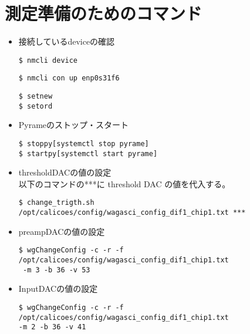 

\section{測定準備のためのコマンド}
\begin{itemize}

\item 接続しているdeviceの確認
\begin{screen}
\begin{verbatim}
$ nmcli device
\end{verbatim}
\end{screen}

\begin{screen}
\begin{verbatim}
$ nmcli con up enp0s31f6
\end{verbatim}
\end{screen}

\begin{screen}
\begin{verbatim}
$ setnew
$ setord
\end{verbatim}
\end{screen}

\item Pyrameのストップ・スタート
\begin{screen}
\begin{verbatim}
$ stoppy[systemctl stop pyrame]
$ startpy[systemctl start pyrame]
\end{verbatim}
\end{screen}


\item thresholdDACの値の設定\\
以下のコマンドの***に threshold DAC の値を代入する。
\begin{screen}
\begin{verbatim}
$ change_trigth.sh  /opt/calicoes/config/wagasci_config_dif1_chip1.txt ***
\end{verbatim}
\end{screen}



\item preampDACの値の設定\\
\begin{screen}
\begin{verbatim}
$ wgChangeConfig -c -r -f /opt/calicoes/config/wagasci_config_dif1_chip1.txt
 -m 3 -b 36 -v 53
\end{verbatim}
\end{screen}


\item InputDACの値の設定\\
\begin{screen}
\begin{verbatim}
$ wgChangeConfig -c -r -f /opt/calicoes/config/wagasci_config_dif1_chip1.txt 
-m 2 -b 36 -v 41
\end{verbatim}
\end{screen}

\end{itemize}

